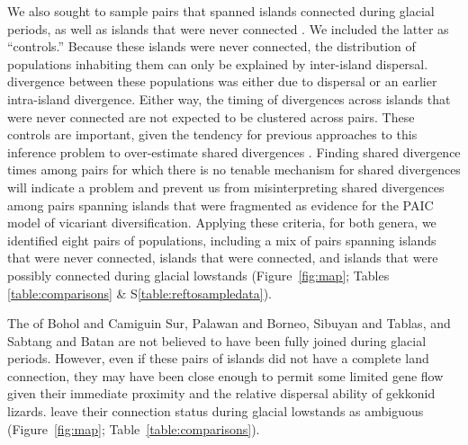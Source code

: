 We also sought to sample pairs that spanned islands connected during glacial
periods, as well as islands that were never connected
.
We included the latter as ``controls.''
Because these islands were never connected, the distribution of  populations
inhabiting them can only be explained by inter-island dispersal.
 divergence between these populations was either due to 
dispersal\jroedit{,}{} or an earlier intra-island divergence.
Either way, the timing of divergences across islands that were never connected
are not expected to be clustered across pairs.
These controls are important, given the tendency for previous approaches to this
inference problem to over-estimate shared divergences
\citep{Oaks2012,Oaks2014reply}.
Finding shared  divergence times among pairs for which there is no
tenable mechanism for shared divergences will indicate a problem and prevent us
from misinterpreting shared divergences among pairs spanning islands that were
fragmented as evidence for the PAIC model of vicariant diversification.
Applying these criteria, for both genera, we identified eight pairs of
populations, including a mix of pairs spanning islands that were never
connected, islands that were connected, and islands that were possibly
connected during glacial lowstands
(Figure~\ref{fig:map};
Tables \ref{table:comparisons} \& S\ref{table:reftosampledata}).

The  of
Bohol and Camiguin Sur,
Palawan and Borneo,
Sibuyan and Tablas, 
and
Sabtang and Batan
are not believed to
have been fully joined during glacial periods.
However, even if these pairs of islands did not have a complete land
connection, they may have been close enough to permit some limited gene flow
given their immediate proximity and the relative dispersal ability of gekkonid
lizards.
leave their connection status during glacial lowstands as ambiguous 
(Figure~\ref{fig:map}; Table~\ref{table:comparisons}).

